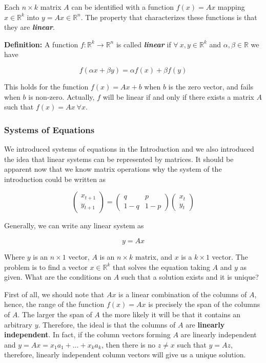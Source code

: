 \documentclass[11pt]{article}
\begin{document}
Each \(n\times k\) matrix \(A\) can be identified with a function
\(f(x) = Ax\) mapping \(x\in\mathbb{R}^k\) into
\(y = Ax \in\mathbb{R}^n\). The property that characterizes these
functions is that they are \textbf{\emph{linear}}.

\textbf{Definition:} A function
\(f : \mathbb{R}^k \rightarrow \mathbb{R}^n\) is called
\textbf{\emph{linear}} if \(\forall \: x,y\in\mathbb{R}^k\) and
\(\alpha,\beta\in\mathbb{R}\) we have

\[
f(\alpha x + \beta y) = \alpha f(x) + \beta f(y)
\]

This holds for the function \(f(x) = Ax + b\) when \(b\) is the zero
vector, and fails when \(b\) is non-zero. Actually, \(f\) will be linear
if and only if there exists a matrix \(A\) such that
\(f(x) = Ax \: \forall x\).

\hypertarget{systems-of-equations-1}{%
\subsubsection{Systems of Equations}\label{systems-of-equations-1}}

We introduced systems of equations in the Introduction and we also
introduced the idea that linear systems can be represented by matrices.
It should be apparent now that we know matrix operations why the system
of the introduction could be written as

\[
\begin{pmatrix} x_{t+1} \\ y_{t+1} \end{pmatrix} = \begin{pmatrix} q & p \\ 1-q & 1-p \end{pmatrix}\begin{pmatrix} x_t \\ y_t \end{pmatrix}
\]

Generally, we can write any linear system as

\[
y = Ax
\]

Where \(y\) is an \(n\times 1\) vector, \(A\) is an \(n\times k\)
matrix, and \(x\) is a \(k\times 1\) vector. The problem is to find a
vector \(x\in\mathbb{R}^k\) that solves the equation taking \(A\) and
\(y\) as given. What are the conditions on \(A\) such that a solution
exists and it is unique?

First of all, we should note that \(Ax\) is a linear combination of the
columns of \(A\), hence, the range of the function \(f(x) = Ax\) is
precisely the span of the columns of \(A\). The larger the span of \(A\)
the more likely it will be that it contains an arbitrary \(y\).
Therefore, the ideal is that the columns of \(A\) are \textbf{linearly
independent}. In fact, if the column vectors forming \(A\) are linearly
independent and \(y = Ax = x_1 a_1 + \ldots + x_k a_k\), then there is
no \(z\neq x\) such that \(y = Az\), therefore, linearly independent
column vectors will give us a unique solution.
\end{document}
